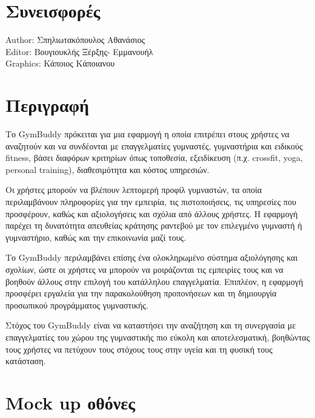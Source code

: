 \documentclass[a4paper,12pt]{article}
\begin{document}

\pagebreak


\section*{Συνεισφορές}
Author: Σπηλιωτακόπουλος Αθανάσιος \\
Editor: Βουγιουκλής Ξέρξης- Εμμανουήλ \\ 
Graphics: Κάποιος Κάποιανου
\clearpage

\section*{Περιγραφή}

\begin{sloppypar} 
\indent Το GymBuddy πρόκειται για μια εφαρμογή η οποία επιτρέπει στους χρήστες να αναζητούν και να συνδέονται με επαγγελματίες γυμναστές, γυμναστήρια και ειδικούς fitness, βάσει διαφόρων κριτηρίων όπως τοποθεσία, εξειδίκευση (π.χ. crossfit, yoga, personal training), διαθεσιμότητα και κόστος υπηρεσιών. 
\end{sloppypar}
\begin{sloppypar} 
\indent Οι χρήστες μπορούν να βλέπουν λεπτομερή προφίλ γυμναστών, τα οποία περιλαμβάνουν πληροφορίες για την εμπειρία, τις πιστοποιήσεις, τις υπηρεσίες που προσφέρουν, καθώς και αξιολογήσεις και σχόλια από άλλους χρήστες. Η εφαρμογή παρέχει τη δυνατότητα απευθείας κράτησης ραντεβού με τον επιλεγμένο γυμναστή ή γυμναστήριο, καθώς και την επικοινωνία μαζί τους. 
\end{sloppypar}
\begin{sloppypar}
Το GymBuddy περιλαμβάνει επίσης ένα ολοκληρωμένο σύστημα αξιολόγησης και σχολίων, ώστε οι χρήστες να μπορούν να μοιράζονται τις εμπειρίες τους και να βοηθούν άλλους στην επιλογή του κατάλληλου επαγγελματία. Επιπλέον, η εφαρμογή προσφέρει εργαλεία για την παρακολούθηση προπονήσεων και τη δημιουργία προσωπικού προγράμματος γυμναστικής.
\end{sloppypar}
\begin{sloppypar}
Στόχος του GymBuddy είναι να καταστήσει την αναζήτηση και τη συνεργασία με επαγγελματίες του χώρου της γυμναστικής πιο εύκολη και αποτελεσματική, βοηθώντας τους χρήστες να πετύχουν τους στόχους τους στην υγεία και τη φυσική τους κατάσταση.
\end{sloppypar}

\clearpage

\section*{Mock up οθόνες}
\end{document}
